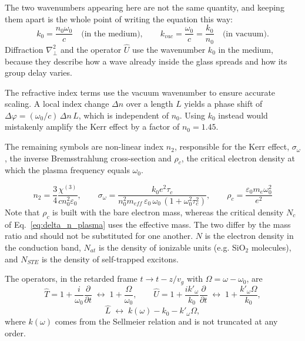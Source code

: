 The two wavenumbers appearing here are not the same quantity, and keeping them apart is the whole point of writing the equation this way:
\begin{equation}
\label{eq:two_wavenumbers}
k_0 = \frac{n_0\omega_0}{c}\quad\text{(in the medium)},
\qquad
k_{vac} = \frac{\omega_0}{c} = \frac{k_0}{n_0}\quad\text{(in vacuum)} .
\end{equation}
Diffraction $\nabla^2_\perp$ and the operator $\hat{U}$ use the wavenumber $k_0$ in the medium, because they describe how a wave already inside the glass spreads and how its group delay varies.

The refractive index terms use the vacuum wavenumber to ensure accurate scaling. A local index change $\Delta n$ over a length $L$ yields a phase shift of $\Delta\varphi = (\omega_0/c)\,\Delta n\,L$, which is independent of $n_0$. Using $k_0$ instead would mistakenly amplify the Kerr effect by a factor of $n_0 = 1.45$.

The remaining symbols are non-linear index $n_2$, responsible for the Kerr effect, $\sigma_\omega$, the inverse Bremsstrahlung cross-section and $\rho_c$, the critical electron density at which the plasma frequency equals $\omega_0$.

\begin{equation}
 n_2 = \frac{3}{4}\frac{\chi^{(3)}}{cn_0^2\varepsilon_0}, \qquad
\sigma_\omega = \dfrac{k_0 e^2 \tau_c}{n_0^2 m_{eff}\,\varepsilon_0\,\omega_0\,(1 + \omega_0^2\tau_c^2)},\qquad
\rho_c = \frac{\varepsilon_0 m_e \omega_0^2}{e^2}  
\end{equation}
Note that $\rho_c$ is built with the bare electron mass, whereas the critical
density $N_c$ of Eq.~\eqref{eq:delta_n_plasma} uses the effective mass. The two
differ by the mass ratio and should not be substituted for one another.
 $N$ is the electron density in the conduction band, $N_{at}$ is the density of ionizable units (e.g. SiO$_2$ molecules), and $N_{STE}$ is the density of self-trapped excitons.

The operators, in the retarded frame $t\to t-z/v_g$ with $\Omega=\omega-\omega_0$, are
\begin{equation}
\hat{T} = 1+\frac{i}{\omega_0}\frac{\partial}{\partial t} \;\longleftrightarrow\; 1+\frac{\Omega}{\omega_0},
\qquad
\hat{U} = 1+\frac{i k'_\omega}{k_0}\frac{\partial}{\partial t} \;\longleftrightarrow\; 1+\frac{k'_\omega\Omega}{k_0},
\end{equation}
\begin{equation}
\hat{L} \;\longleftrightarrow\; k(\omega)-k_0-k'_\omega\Omega ,
\end{equation}
where $k(\omega)$ comes from the Sellmeier relation and is not truncated at any order.

